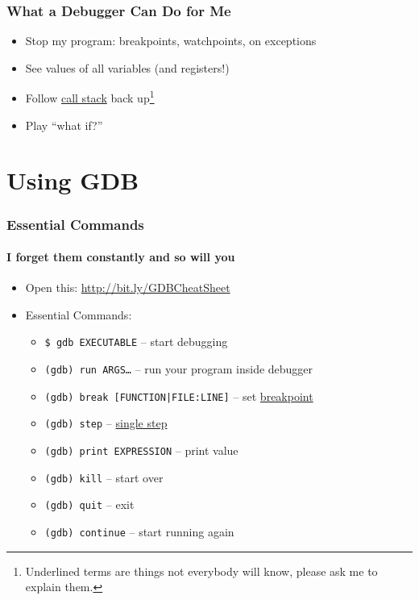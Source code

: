 \documentclass[aspectratio=169]{beamer}
\newcommand{\code}{\texttt}
\begin{document}
\begin{frame}
    \frametitle{What a Debugger Can Do for Me}

    \begin{itemize}
        \item Stop my program: breakpoints, watchpoints, on exceptions
        \item See values of all variables (and registers!)
        \item Follow \underline{call stack} back up\footnote[frame]{Underlined terms are things not everybody will know, please ask me to explain them.}
        \item Play ``what if?''
    \end{itemize}

\end{frame}
\section{Using GDB}
\begin{frame}
    \frametitle{Essential Commands}
    \framesubtitle{I forget them constantly and so will you}
    \begin{itemize}
        \item Open this: \url{http://bit.ly/GDBCheatSheet}
        \item Essential Commands:
        \begin{itemize}
            \item \code{\$ gdb EXECUTABLE} -- start debugging
            \item \code{(gdb) run ARGS\dots} -- run your program inside debugger
            \item \code{(gdb) break [FUNCTION|FILE:LINE]} -- set \underline{breakpoint}
            \item \code{(gdb) step} -- \underline{single step}
            \item \code{(gdb) print EXPRESSION} -- print value
            \item \code{(gdb) kill} -- start over
            \item \code{(gdb) quit} -- exit
            \item \code{(gdb) continue} -- start running again
        \end{itemize}
    \end{itemize}
    

\end{frame}
\end{document}
